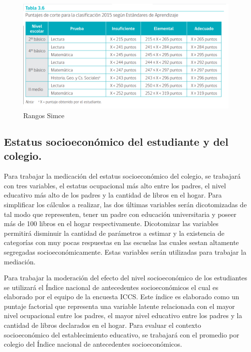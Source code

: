 \documentclass[12pt,twoside]{templates/facsothesis}
\begin{document}
\begin{figure}

{\centering \includegraphics[width=0.8\linewidth]{images/Rangos-puntaje-simce} 

}

\caption{Rangos Simce}\label{fig:unnamed-chunk-5}
\end{figure}

\hypertarget{estatus-socioeconuxf3mico-del-estudiante-y-del-colegio.}{%
\subsection{Estatus socioeconómico del estudiante y del colegio.}\label{estatus-socioeconuxf3mico-del-estudiante-y-del-colegio.}}

Para trabajar la medicación del estatus socioeconómico del colegio, se trabajará con tres variables, el estatus ocupacional más alto entre los padres, el nivel educativo más alto de los padres y la cantidad de libros en el hogar. Para simplificar los cálculos a realizar, las dos últimas variables serán dicotomizadas de tal modo que representen, tener un padre con educación universitaria y poseer más de 100 libros en el hogar respectivamente. Dicotomizar las variables permitirá disminuir la cantidad de parámetros a estimar y la existencia de categorías con muy pocas respuestas en las escuelas las cuales sestan altamente segregadas socioeconómicamente. Estas variables serán utilizadas para trabajar la mediación.

Para trabajar la moderación del efecto del nivel socioeconómico de los estudiantes se utilizará el Índice nacional de antecedentes socioeconómicos el cual es elaborado por el equipo de la encuesta ICCS. Este índice es elaborado como un puntaje factorial que representa una variable latente relacionada con el mayor nivel ocupacional entre los padres, el mayor nivel educativo entre los padres y la cantidad de libros declarados en el hogar. Para evaluar el contexto socioeconómico del establecimiento educativo, se trabajará con el promedio por colegio del Índice nacional de antecedentes socioeconómicos.
\end{document}
